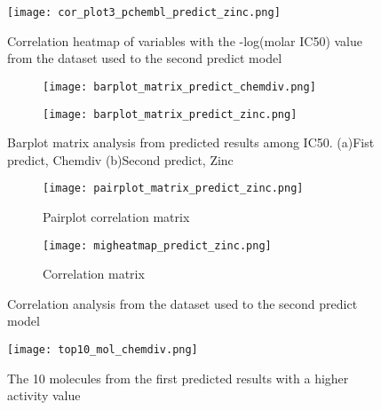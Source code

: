 \documentclass[final,times,twocolumn,article]{elsarticle}
\begin{document}
 \begin{figure}[h]
    \centering 
     \texttt{[image: cor\_plot3\_pchembl\_predict\_zinc.png]}	
     \caption{Correlation heatmap of variables with the -log(molar IC50) value from the dataset used to the second predict model} 
     \label{Figure11}
 \end{figure}

 \begin{figure*}
    \centering
    \begin{subfigure}{1\textwidth}
        \centering
        \texttt{[image: barplot\_matrix\_predict\_chemdiv.png]} 
        \caption{}
    \end{subfigure}
    \begin{subfigure}{1\textwidth}
        \centering
        \texttt{[image: barplot\_matrix\_predict\_zinc.png]}
        \caption{}
    \end{subfigure}
    
    \caption{Barplot matrix analysis from predicted results among IC50. (a)Fist predict, Chemdiv (b)Second predict, Zinc }
    \label{Figure12}
\end{figure*}


 \begin{figure*}
    \begin{subfigure}{0.6\textwidth}
        \texttt{[image: pairplot\_matrix\_predict\_zinc.png]} 
        \caption{Pairplot correlation matrix}
    \end{subfigure}
    \hfill
    \begin{subfigure}{0.6\textwidth}
        \texttt{[image: migheatmap\_predict\_zinc.png]}
        \caption{Correlation matrix}
    \end{subfigure}
    
    \caption{Correlation analysis from the dataset used to the second predict model}
    \label{Figure13}
\end{figure*}


 \begin{figure*}
    \centering 
     \texttt{[image: top10\_mol\_chemdiv.png]}	
     \caption{The 10 molecules from the first predicted results with a higher activity value} 
     \label{Figure14}
 \end{figure*}
\end{document}

